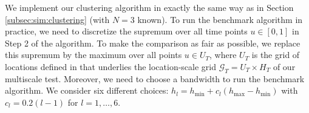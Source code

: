 \documentclass[12pt]{article}
\makeatletter
\renewcommand{\eqref}[1]{\tagform@{\ref{#1}}}
\makeatother
\begin{document}
We implement our clustering algorithm in exactly the same way as in Section \ref{subsec:sim:clustering} (with $N=3$ known). To run the benchmark algorithm in practice, we need to discretize the supremum over all time points $u \in [0,1]$ in Step 2 of the algorithm. To make the comparison as fair as possible, we replace this supremum by the maximum over all points $u \in U_T$, where $U_T$ is the grid of locations defined in \eqref{eq:grid-loc} that underlies the location-scale grid $\mathcal{G}_T = U_T \times H_T$ of our multiscale test. Moreover, we need to choose a bandwidth to run the benchmark algorithm. We consider six different choices: $h_l = h_{\min} + c_l (h_{\max} - h_{\min})$ with $c_l = 0.2(l-1)$ for $l=1,\ldots,6$.



\begin{table}[t!]
\footnotesize{  
\begin{center}
\caption{Empirical probabilities that the estimated group structure is identical to the true group structure $\{ G_1,G_2,G_3\}$. $\mathcal{T}_{\text{MS}}$ denotes our multiscale method and $\mathcal{T}_{\text{bmk, }l}$ the benchmark procedure with bandwidth $h_l$ ($l=1,\ldots,6$). 
}\label{tab:clustering:comparison}
\renewcommand{\arraystretch}{1.2}  

\end{center}}
\end{table}
\end{document}
